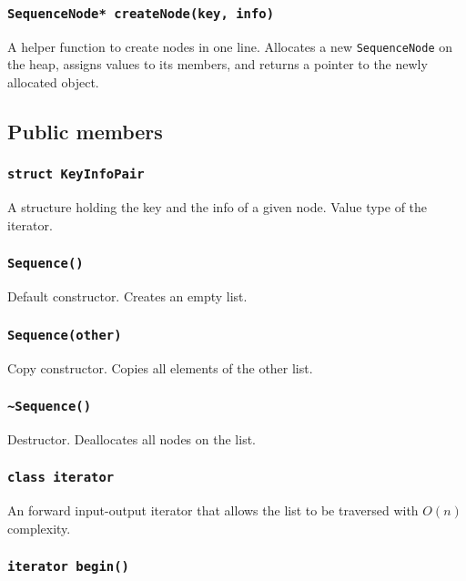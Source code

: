 ﻿\documentclass{article}
\begin{document}
\subsubsection{{\tt SequenceNode* createNode(key, info)}}

A helper function to create nodes in one line. Allocates a new
{\tt SequenceNode} on the heap, assigns values to its members, and returns a
pointer to the newly allocated object.

\subsection{Public members}

\subsubsection{{\tt struct KeyInfoPair}}

A structure holding the key and the info of a given node. Value type of the
iterator.

\subsubsection{{\tt Sequence()}}

Default constructor. Creates an empty list.

\subsubsection{{\tt Sequence(other)}}

Copy constructor. Copies all elements of the other list.

\subsubsection{{\tt \~{}Sequence()}}

Destructor. Deallocates all nodes on the list.

\subsubsection{{\tt class iterator}}

An forward input-output iterator that allows the list to be traversed with
$O(n)$ complexity.

\subsubsection{{\tt iterator begin()}}
\end{document}
